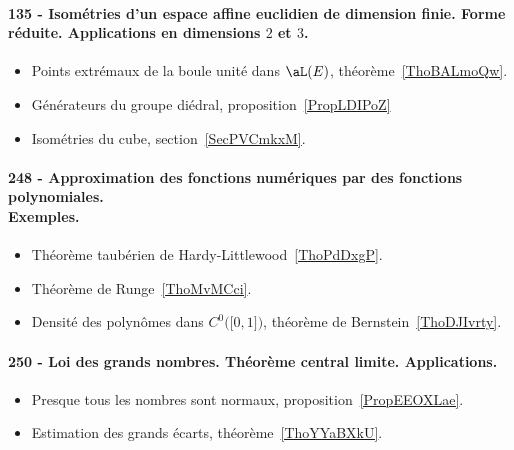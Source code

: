 \paragraph{135 - Isométries d'un espace affine euclidien de dimension finie. Forme réduite. Applications en dimensions $2$ et $3$.}
\begin{itemize}
    \item Points extrémaux de la boule unité dans \( \aL(E)\), théorème~\ref{ThoBALmoQw}.
    \item Générateurs du groupe diédral, proposition~\ref{PropLDIPoZ}
    \item Isométries du cube, section~\ref{SecPVCmkxM}.
\end{itemize}

\paragraph{248 - Approximation des fonctions numériques par des fonctions polynomiales.\\ Exemples.}
\begin{itemize}
    \item Théorème taubérien de Hardy-Littlewood~\ref{ThoPdDxgP}.
    \item Théorème de Runge~\ref{ThoMvMCci}.
    \item Densité des polynômes dans \( C^0\big( \mathopen[ 0 , 1 \mathclose] \big)\), théorème de Bernstein~\ref{ThoDJIvrty}.
\end{itemize}
\paragraph{250 - Loi des grands nombres. Théorème central limite. Applications.}
\begin{itemize}
    \item Presque tous les nombres sont normaux, proposition~\ref{PropEEOXLae}.
    \item Estimation des grands écarts, théorème~\ref{ThoYYaBXkU}.
\end{itemize}
